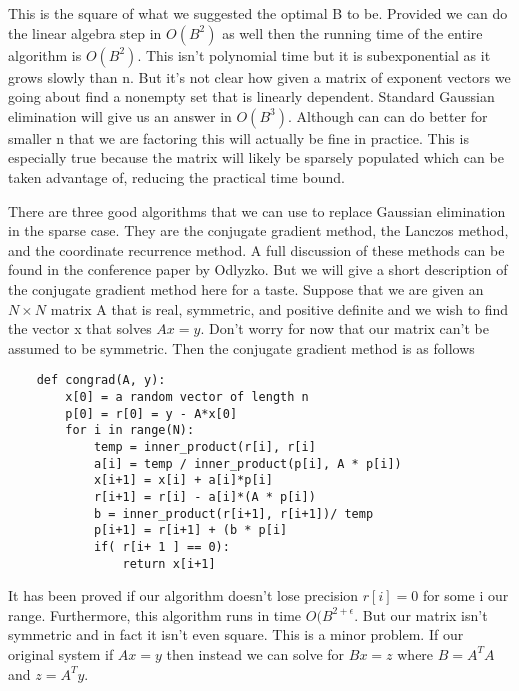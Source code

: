 \documentclass{article}
\begin{document}
This is the square of what we suggested the optimal B to be. Provided we can do the linear algebra step in $O(B^2)$ as well then the running time of the entire algorithm is $O(B^2) $. This isn't polynomial time but it is subexponential as it grows slowly than n. But it's not clear how given a matrix of exponent vectors we going about find a nonempty set that is linearly dependent. Standard Gaussian elimination will give us an answer in $O(B^3)$. Although can can do better for smaller n that we are factoring this will actually be fine in practice. This is especially true because the matrix will likely be sparsely populated which can be taken advantage of, reducing the practical time bound. 

There are three good algorithms that we can use to replace Gaussian elimination in the sparse case. They are the conjugate gradient method, the Lanczos method, and the coordinate recurrence method. A full discussion of these methods can be found in the conference paper by Odlyzko\cite{discretelog}. But we will give a short description of the conjugate gradient method here for a taste. Suppose that we are given an $N \times N$ matrix A that is real, symmetric, and positive definite and we wish to find the vector x that solves $Ax = y$. Don't worry for now that our matrix can't be assumed to be symmetric. Then the conjugate gradient method is as follows
\begin{verbatim}
    def congrad(A, y):
        x[0] = a random vector of length n
        p[0] = r[0] = y - A*x[0]
        for i in range(N): 
            temp = inner_product(r[i], r[i]
            a[i] = temp / inner_product(p[i], A * p[i])
            x[i+1] = x[i] + a[i]*p[i]
            r[i+1] = r[i] - a[i]*(A * p[i])
            b = inner_product(r[i+1], r[i+1])/ temp
            p[i+1] = r[i+1] + (b * p[i]
            if( r[i+ 1 ] == 0):
                return x[i+1]
\end{verbatim}

It has been proved if our algorithm doesn't lose precision $r[i] = 0$ for some i our range\cite{hestenes1952methods}. Furthermore, this algorithm runs in time $O(B^{2 + \epsilon}$.   But our matrix isn't symmetric and in fact it isn't even square. This is a minor problem. If our original system if $Ax = y$ then instead we can solve for $B x = z $ where $B = A^T A$ and $z = A^T y$. 
\end{document}
